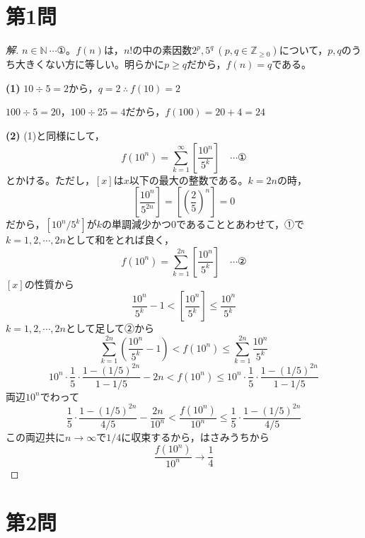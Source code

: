 \documentclass[../main.tex]{subfiles}
\begin{document}
\section*{第1問}

\begin{proof}[解]
  $n\in\mathbb{N}\ \cdots$①。$f(n)$は，$n!$の中の素因数$2^p,5^q\ (p,q\in\mathbb{Z}_{\ge0})$について，$p,q$のうち大きくない方に等しい。明らかに$p\ge q$だから，$f(n)=q$である。

  \textbf{(1)} $10\div5=2$から，$q=2\ \therefore\ f(10)=2$

  $100\div5=20$，$100\div25=4$だから，$f(100)=20+4=24$

  \textbf{(2)} (1)と同様にして，
  \[
    f(10^n)=\sum_{k=1}^\infty\left[\frac{10^n}{5^k}\right] \quad\cdots\text{①}
  \]
  とかける。ただし，$[x]$は$x$以下の最大の整数である。$k=2n$の時，
  \[
    \left[\frac{10^n}{5^{2n}}\right]=\left[\left(\frac{2}{5}\right)^n\right]=0
  \]
  だから，$[10^n/5^k]$が$k$の単調減少かつ0であることとあわせて，①で$k=1,2,\cdots,2n$として和をとれば良く，
  \[
    f(10^n)=\sum_{k=1}^{2n}\left[\frac{10^n}{5^k}\right] \quad\cdots\text{②}
  \]
  $[x]$の性質から
  \[
    \frac{10^n}{5^k}-1<\left[\frac{10^n}{5^k}\right]\le\frac{10^n}{5^k}
  \]
  $k=1,2,\cdots,2n$として足して②から
  \[
    \sum_{k=1}^{2n}\left(\frac{10^n}{5^k}-1\right)<f(10^n)\le\sum_{k=1}^{2n}\frac{10^n}{5^k}
  \]
  \[
    10^n\cdot\frac15\cdot\frac{1-(1/5)^{2n}}{1-1/5}-2n<f(10^n)\le10^n\cdot\frac15\cdot\frac{1-(1/5)^{2n}}{1-1/5}
  \]
  両辺$10^n$でわって
  \[
    \frac15\cdot\frac{1-(1/5)^{2n}}{4/5}-\frac{2n}{10^n}<\frac{f(10^n)}{10^n}\le\frac15\cdot\frac{1-(1/5)^{2n}}{4/5}
  \]
  この両辺共に$n\to\infty$で$1/4$に収束するから，はさみうちから
  \[
    \frac{f(10^n)}{10^n}\longrightarrow\frac14
  \]
\end{proof}

\newpage

\section*{第2問}
\end{document}
